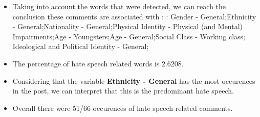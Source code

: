 \documentclass[11pt]{article}
\begin{document}
\begin{itemize}\item Taking into account the words that were detected, we can reach the conclusion these comments are associated with : : Gender - General;Ethnicity - General;Nationality - General;Physical Identity - Physical (and Mental) Impairments;Age - Youngsters;Age - General;Social Class - Working class; Ideological and Political Identity - General;%

\item The percentage of hate speech related words is 2.6208.

\item Considering that the variable \textbf{Ethnicity - General} has the most occurences in the post, we can interpret that this is the predominant hate speech.

\item Overall there were 51/66 occurences of hate speech related comments.\end{itemize}
\end{document}
